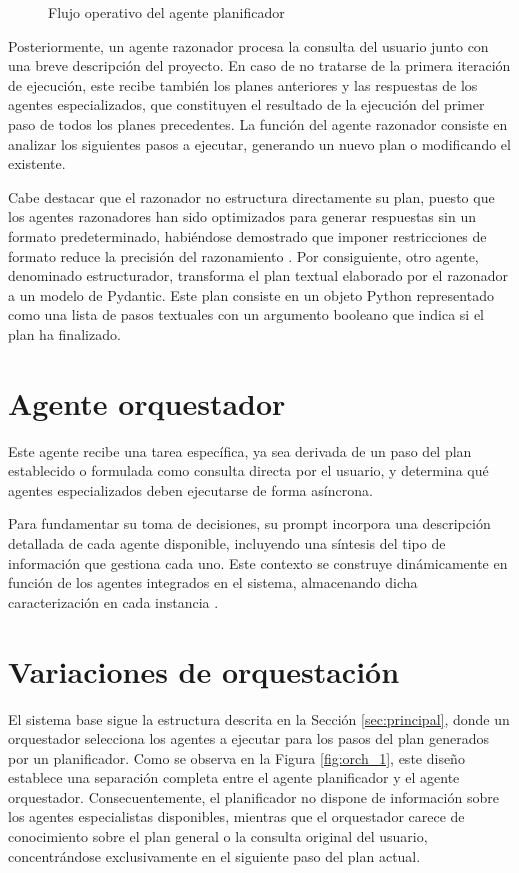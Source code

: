 \begin{figure}[h]
\centering
{}
\caption{Flujo operativo del agente planificador}
\label{fig:planner}
\end{figure}
Posteriormente, un agente razonador procesa la consulta del usuario junto con una breve descripción del proyecto. En caso de no tratarse de la primera iteración de ejecución, este recibe también los planes anteriores y las respuestas de los agentes especializados, que constituyen el resultado de la ejecución del primer paso de todos los planes precedentes. La función del agente razonador consiste en analizar los siguientes pasos a ejecutar, generando un nuevo plan o modificando el existente.

Cabe destacar que el razonador no estructura directamente su plan, puesto que los agentes razonadores han sido optimizados para generar respuestas sin un formato predeterminado, habiéndose demostrado que imponer restricciones de formato reduce la precisión del razonamiento \cite{tam_let_2024}. Por consiguiente, otro agente, denominado estructurador, transforma el plan textual elaborado por el razonador a un modelo de Pydantic. Este plan consiste en un objeto Python representado como una lista de pasos textuales con un argumento booleano que indica si el plan ha finalizado.

\section{Agente orquestador}
\label{sec:agente_orquestador}
Este agente recibe una tarea específica, ya sea derivada de un paso del plan establecido o formulada como consulta directa por el usuario, y determina qué agentes especializados deben ejecutarse de forma asíncrona.

Para fundamentar su toma de decisiones, su prompt incorpora una descripción detallada de cada agente disponible, incluyendo una síntesis del tipo de información que gestiona cada uno. Este contexto se construye dinámicamente en función de los agentes integrados en el sistema, almacenando dicha caracterización en cada instancia .

\section{Variaciones de orquestación}
\label{sec:vars}
El sistema base sigue la estructura descrita en la Sección \ref{sec:principal}, donde un orquestador selecciona los agentes a ejecutar para los pasos del plan generados por un planificador. Como se observa en la Figura \ref{fig:orch_1}, este diseño establece una separación completa entre el agente planificador y el agente orquestador. Consecuentemente, el planificador no dispone de información sobre los agentes especialistas disponibles, mientras que el orquestador carece de conocimiento sobre el plan general o la consulta original del usuario, concentrándose exclusivamente en el siguiente paso del plan actual.

